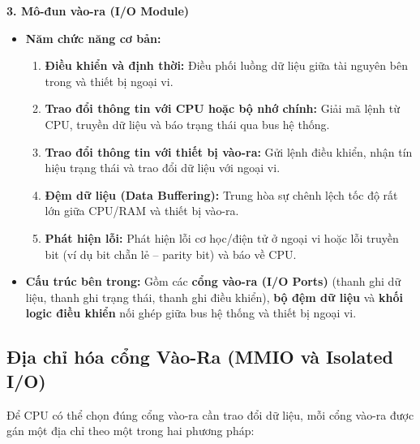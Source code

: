 \textbf{3. Mô-đun vào-ra (I/O Module)}
\begin{itemize}
    \item \textbf{Năm chức năng cơ bản:}
    \begin{enumerate}[label=\arabic*.]
        \item \textbf{Điều khiển và định thời:} Điều phối luồng dữ liệu giữa tài nguyên bên trong và thiết bị ngoại vi.
        \item \textbf{Trao đổi thông tin với CPU hoặc bộ nhớ chính:} Giải mã lệnh từ CPU, truyền dữ liệu và báo trạng thái qua bus hệ thống.
        \item \textbf{Trao đổi thông tin với thiết bị vào-ra:} Gửi lệnh điều khiển, nhận tín hiệu trạng thái và trao đổi dữ liệu với ngoại vi.
        \item \textbf{Đệm dữ liệu (Data Buffering):} Trung hòa sự chênh lệch tốc độ rất lớn giữa CPU/RAM và thiết bị vào-ra.
        \item \textbf{Phát hiện lỗi:} Phát hiện lỗi cơ học/điện tử ở ngoại vi hoặc lỗi truyền bit (ví dụ bit chẵn lẻ -- parity bit) và báo về CPU.
    \end{enumerate}
    \item \textbf{Cấu trúc bên trong:} Gồm các \textbf{cổng vào-ra (I/O Ports)} (thanh ghi dữ liệu, thanh ghi trạng thái, thanh ghi điều khiển), \textbf{bộ đệm dữ liệu} và \textbf{khối logic điều khiển} nối ghép giữa bus hệ thống và thiết bị ngoại vi.
\end{itemize}

\subsection{Địa chỉ hóa cổng Vào-Ra (MMIO và Isolated I/O)}

Để CPU có thể chọn đúng cổng vào-ra cần trao đổi dữ liệu, mỗi cổng vào-ra được gán một địa chỉ theo một trong hai phương pháp:

